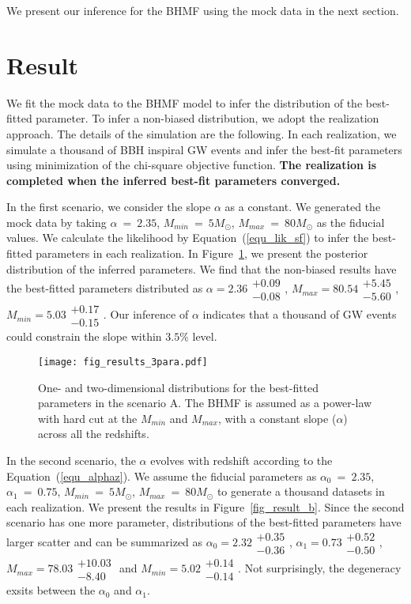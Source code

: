 \documentclass[twocolumn]{aastex62}
\begin{document}
 We present our inference for the BHMF using the mock data in the next section. 


\vspace{1cm}
\section{Result}\label{sec_result}
We fit the mock data to the BHMF model to infer the distribution of the best-fitted parameter. To infer a non-biased distribution, we adopt the realization approach. The details of the simulation are the following. In each realization, we simulate a thousand of BBH inspiral GW events and infer the best-fit parameters using minimization of the chi-square objective function. 
\textbf{The realization is completed when the inferred best-fit parameters converged.} 

In the first scenario, we consider the slope $\alpha$ as a constant. We generated the mock data by taking $\alpha~=~2.35$, $M_{min}~=~5M_{\odot}$, $M_{max}~=~80M_{\odot}$ as the fiducial values. We calculate the likelihood by Equation~(\ref{equ_lik_sf}) to infer the best-fitted parameters in each realization. In Figure~\ref{fig_result_a}, we present the posterior distribution of the inferred parameters. We find that the non-biased results have the  best-fitted parameters distributed as $\alpha = 2.36\substack{+0.09\\-0.08}$, $M_{max} = 80.54\substack{+5.45\\-5.60}$,  $M_{min} = 5.03\substack{+0.17\\-0.15}$. Our inference of $\alpha$ indicates that a thousand of GW events could constrain the slope within $3.5\%$ level.

\begin{figure}%
\texttt{[image: fig\_results\_3para.pdf]}
\caption{
One- and two-dimensional distributions for the best-fitted parameters in the scenario A. The BHMF is assumed as a power-law with hard cut at the $M_{min}$ and $M_{max}$, with a constant slope ($\alpha$) across all the redshifts.
}
\label{fig_result_a}
\end{figure}

In the second scenario, the $\alpha$ evolves with redshift according to the Equation~(\ref{equ_alphaz}). We assume the fiducial parameters as $\alpha_0~=~2.35$, $\alpha_1~=~0.75$, $M_{min}~=~5M_{\odot}$, $M_{max}~=~80M_{\odot}$ to generate a thousand datasets in each realization. We present the results in Figure~\ref{fig_result_b}. Since the second scenario has one more parameter, distributions of the best-fitted parameters have larger scatter and can be summarized as $\alpha_0 = 2.32\substack{+0.35\\-0.36}$, $\alpha_1 = 0.73\substack{+0.52\\-0.50}$, $M_{max} = 78.03\substack{+10.03\\-8.40}$ and  $M_{min} = 5.02\substack{+0.14\\-0.14}$. Not surprisingly, the degeneracy exsits between the $\alpha_0$ and $\alpha_1$. 
\end{document}
